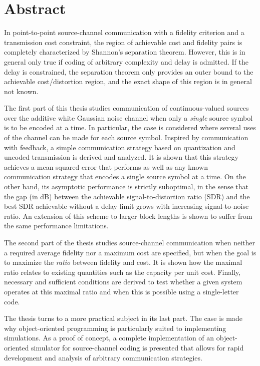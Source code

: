 \chapter*{Abstract}
\nocite{KleinerR2009a}



In point-to-point source-channel communication with a fidelity criterion and a transmission cost constraint, the region of achievable cost and fidelity pairs is completely characterized by Shannon's separation theorem. However, this is in general only true if coding of arbitrary complexity and delay is admitted. If the delay is constrained, the separation theorem only provides an outer bound to the achievable cost\slash distortion region, and the exact shape of this region is in general not known.

The first part of this thesis studies communication of continuous-valued sources over the additive white Gaussian noise channel when only a \emph{single} source symbol is to be encoded at a time. In particular, the case is considered where several uses of the channel can be made for each source symbol. Inspired by communication with feedback, a simple communication strategy based on quantization and uncoded transmission is derived and analyzed. It is shown that this strategy achieves a mean squared error that performs as well as any known communication strategy that encodes a single source symbol at a time. On the other hand, its asymptotic performance is strictly suboptimal, in the sense that the gap (in dB) between the achievable signal-to-distortion ratio (SDR) and the best SDR achievable without a delay limit grows with increasing signal-to-noise ratio. An extension of this scheme to larger block lengths is shown to suffer from the same performance limitations. 

The second part of the thesis studies source-channel communication when neither
a required average fidelity nor a maximum cost are specified, but when the goal
is to maximize the \emph{ratio} between fidelity and cost. It is shown how the
maximal ratio relates to existing quantities such as the capacity per unit cost.
Finally, necessary and sufficient conditions are derived to test whether a given
system operates at this maximal ratio and when this is possible using a
single-letter code.

The thesis turns to a more practical subject in its last part. The case is made why object-oriented programming is particularly suited to implementing simulations. As a proof of concept, a complete implementation of an object-oriented simulator for source-channel coding is presented that allows for rapid development and analysis of arbitrary communication strategies.
